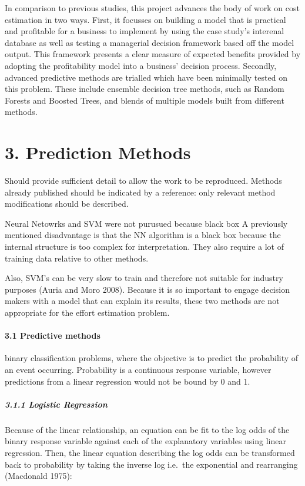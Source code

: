 \documentclass[]{elsarticle} %
\begin{document}
In comparison to previous studies, this project advances the body of
work on cost estimation in two ways. First, it focusses on building a
model that is practical and profitable for a business to implement by
using the case study's interenal database as well as testing a
managerial decision framework based off the model output. This framework
presents a clear measure of expected benefits provided by adopting the
profitability model into a business' decision process. Secondly,
advanced predictive methods are trialled which have been minimally
tested on this problem. These include ensemble decision tree methods,
such as Random Forests and Boosted Trees, and blends of multiple models
built from different methods.

\section{3. Prediction Methods}\label{prediction-methods}

Should provide sufficient detail to allow the work to be reproduced.
Methods already published should be indicated by a reference: only
relevant method modifications should be described.

Neural Netowrks and SVM were not purusued because black box A previously
mentioned disadvantage is that the NN algorithm is a black box because
the internal structure is too complex for interpretation. They also
require a lot of training data relative to other methods.

Also, SVM's can be very slow to train and therefore not suitable for
industry purposes (Auria and Moro 2008). Because it is so important to
engage decision makers with a model that can explain its results, these
two methods are not appropriate for the effort estimation problem.

\paragraph{3.1 Predictive methods}\label{predictive-methods}

binary classification problems, where the objective is to predict the
probability of an event occurring. Probability is a continuous response
variable, however predictions from a linear regression would not be
bound by 0 and 1.

\subparagraph{3.1.1 Logistic Regression}\label{logistic-regression}

Because of the linear relationship, an equation can be fit to the log
odds of the binary response variable against each of the explanatory
variables using linear regression. Then, the linear equation describing
the log odds can be transformed back to probability by taking the
inverse log i.e.~the exponential and rearranging (Macdonald 1975):
\end{document}
